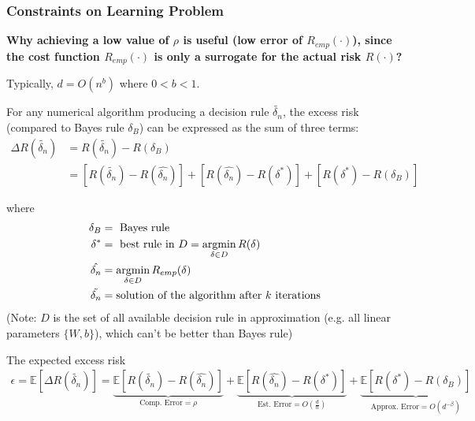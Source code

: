 \documentclass[11pt,a4paper]{article}
\newcommand{\argmin}{\operatornamewithlimits{argmin}}
\begin{document}
\subsubsection{Constraints on Learning Problem}
\textbf{Why achieving a low value of $\rho$ is useful (low error of $R_{emp}(\cdot)$), since the cost function $R_{emp}(\cdot)$ is only a surrogate for the actual risk $R(\cdot)$?}


Typically, $d=O(n^b)$ where $0<b<1$.

For any numerical algorithm producing a decision rule $\tilde{\delta_n}$, the excess risk (compared to Bayes rule $\delta_B$) can be expressed as the sum of three terms:
\begin{equation}
    \begin{aligned}
        \Delta R(\tilde{\delta_n})&=R(\tilde{\delta_n})-R(\delta_B)\\&=[R(\tilde{\delta_n})-R(\hat{\delta_n})]+[R(\hat{\delta_n})-R(\delta^*)]+[R(\delta^*)-R(\delta_B)]
    \end{aligned}
    \nonumber
\end{equation}

where
\begin{equation}
    \begin{aligned}
        \delta_B&=\text{ Bayes rule}\\
        \delta^*&=\text{ best rule in } D=\argmin_{\delta\in D} R(\delta)\\
        \hat{\delta_n}&=\argmin_{\delta\in D}R_{emp}(\delta)\\
        \tilde{\delta_n}&=\text{solution of the algorithm after $k$ iterations}
    \end{aligned}
    \nonumber
\end{equation}
(Note: $D$ is the set of all available decision rule in approximation (e.g. all linear parameters $\{W,b\}$), which can't be better than Bayes rule)

The expected excess risk
\begin{equation}
    \begin{aligned}
        \epsilon =\mathbb{E}[\Delta R(\tilde{\delta_n})]=\underbrace{\mathbb{E}[R(\tilde{\delta_n})-R(\hat{\delta_n})]}_{\text{Comp. Error}=\rho}+\underbrace{\mathbb{E}[R(\hat{\delta_n})-R(\delta^*)]}_{\text{Est. Error}=O(\frac{d}{n})}+\underbrace{\mathbb{E}[R(\delta^*)-R(\delta_B)]}_{\text{Approx. Error}=O(d^{-\beta})}
    \end{aligned}
    \nonumber
\end{equation}
\end{document}
